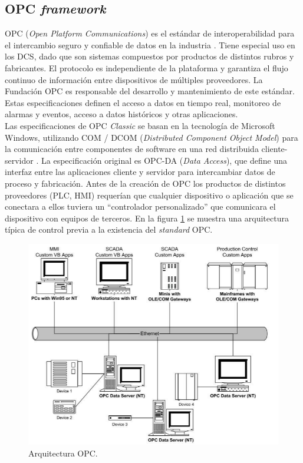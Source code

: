 \subsection{OPC \textit{framework}}

OPC (\textit{Open Platform Communications}) es el estándar de interoperabilidad para el intercambio seguro y confiable de datos en la industria \citep{OPC}. Tiene especial uso en los DCS, dado que son sistemas compuestos por productos de distintos rubros y fabricantes. El protocolo es independiente de la plataforma y garantiza el flujo continuo de información entre dispositivos de múltiples proveedores. La Fundación OPC es responsable del desarrollo y mantenimiento de este estándar. Estas especificaciones definen el acceso a datos en tiempo real, monitoreo de alarmas y eventos, acceso a datos históricos y otras aplicaciones.\\

Las especificaciones de OPC \textit{Classic}  se basan en la tecnología de Microsoft Windows, utilizando COM / DCOM (\textit{Distributed Component Object Model}) para la comunicación entre componentes de software en una red distribuida cliente-servidor \citep{OPCclassic}. La especificación original es OPC-DA (\textit{Data Access}), que define una interfaz entre las aplicaciones cliente y servidor para intercambiar datos de proceso y fabricación. Antes de la creación de OPC los productos de distintos proveedores (PLC, HMI) requerían que cualquier dispositivo o aplicación que se conectara a ellos tuviera un ``controlador personalizado'' que comunicara el dispositivo con equipos de terceros. En la figura \ref{fig:OPCAQ} se muestra una arquitectura típica de control previa a la existencia del \textit{standard} OPC.

\begin{figure}[htpb]
	\centering
	\includegraphics[scale=0.6]{./Figures/opc_0.png}
	\caption{Arquitectura OPC\protect\footnotemark.}
	\label{fig:OPCAQ}
\end{figure}

